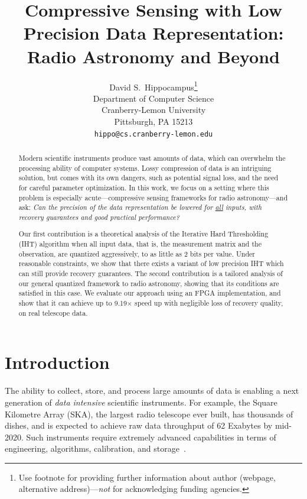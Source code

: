 \documentclass{article}
\title{Compressive Sensing with Low Precision Data Representation: Radio Astronomy and Beyond}
\author{
  David S.~Hippocampus\thanks{Use footnote for providing further
    information about author (webpage, alternative
    address)---\emph{not} for acknowledging funding agencies.} \\
  Department of Computer Science\\
  Cranberry-Lemon University\\
  Pittsburgh, PA 15213 \\
  \texttt{hippo@cs.cranberry-lemon.edu} \\
}
\begin{document}
\maketitle
\begin{abstract}
Modern scientific instruments produce vast amounts of data, which can overwhelm the processing ability of computer systems. 
Lossy compression of data is an intriguing solution, 
but comes with its own dangers, such as potential signal loss, and the need for careful parameter optimization. 
In this work, we focus on a setting where this problem is especially acute---compressive sensing frameworks for radio astronomy---and ask: 
{\em Can the precision of the data representation be lowered for \underline{all} 
inputs, with recovery guarantees and good practical performance?}

Our first contribution is a
theoretical analysis of the Iterative Hard 
Thresholding (IHT) algorithm when all input
data, that is, the measurement matrix and the
observation, are quantized aggressively, to as little as 
2 bits per value. 
Under reasonable constraints, 
we show that there exists a variant of low precision IHT which can still provide recovery guarantees. 
The second contribution is a tailored 
analysis of our general quantized framework  
to radio astronomy, showing that its conditions are satisfied in this case. 
We evaluate our approach 
using an FPGA implementation, and show that
it can achieve up to 9.19$\times$ speed up with
negligible loss of recovery quality, on  real telescope data.
\end{abstract}

\vspace{-1em}
\section{Introduction}
\vspace{-.5em}

The ability to collect, store, and process large amounts of
data is enabling a next generation of {\em data intensive} scientific 
instruments. For example,
the Square Kilometre Array (SKA), the largest
radio telescope ever built, has thousands of 
dishes, and is expected to achieve
raw data throughput of 62 Exabytes by mid-2020.
Such instruments require extremely advanced  
capabilities in terms of engineering, algorithms, calibration, and storage~\cite{hu}. 

\end{document}
